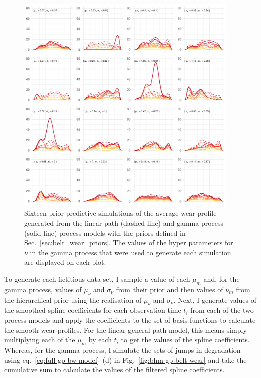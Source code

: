 \begin{figure}[tbp]
  \centering
  \includegraphics[width=0.95\textwidth]{figures/ch-6/prior-pc.pdf}
  \caption{Sixteen prior predictive simulations of the average wear profile generated from the linear path (dashed line) and gamma process (solid line) process models with the priors defined in Sec.~\ref{sec:belt_wear_priors}. The values of the hyper parameters for $\nu$ in the gamma process that were used to generate each simulation are displayed on each plot.}
  \label{fig:prior-pc-beltwear}
\end{figure}

To generate each fictitious data set, I sample a value of each $\mu_m$ and, for the gamma process, values of $\mu_\nu$ and $\sigma_\nu$ from their prior and then values of $\nu_m$ from the hierarchical prior using the realisation of $\mu_\nu$ and $\sigma_\nu$. Next, I generate values of the smoothed spline coefficients for each observation time $t_i$ from each of the two process models and apply the coefficients to the set of basis functions to calculate the smooth wear profiles. For the linear general path model, this means simply multiplying each of the $\mu_m$ by each $t_i$ to get the values of the spline coefficients. Whereas, for the gamma process, I simulate the sets of jumps in degradation using eq.~\eqref{eq:full-gp-bw-model}~(d) in Fig.~\ref{fig:bhm-gp-belt-wear} and take the cumulative sum to calculate the values of the filtered spline coefficients.


